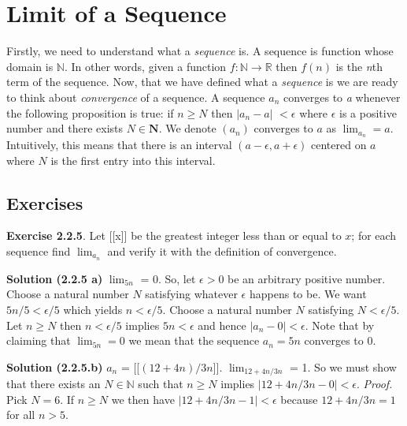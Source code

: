 \documentclass[10pt]{amsbook}
\begin{document}
\section{Limit of a Sequence}
Firstly, we need to understand what a \textit{sequence} is. A sequence is function whose domain is $\mathbb{N}$. In other words, given a function $f: \mathbb{N} \to \mathbb{R}$ then $f(n)$ is the \textit{n}th term of the sequence.
Now, that we have defined what a \textit{sequence} is  we are ready to think about \textit{convergence} of a sequence. A sequence $a_{n}$ converges to \textit{a} whenever the following proposition is true: if $n \ge N$ then $\left|a_{n}-a\right|$ $< \epsilon$ where $\epsilon$ is a positive number and there exists $N \in \mathbf{N}$. We denote $\left(a_{n}\right)$ converges to $a$ as $\lim_{a_{n}} = a$. Intuitively, this means that there is an interval $\left(a-\epsilon, a+\epsilon\right)$ centered on $a$ where $N$ is the first entry into this interval.
\subsection{Exercises}
\textbf{Exercise 2.2.5}. Let [[x]] be the greatest integer less than or equal to $x$; for each sequence find $\lim_{a_{n}}$ and verify it with the definition of convergence.

\textbf{Solution (2.2.5 a)}
$\lim_{5n}$ = 0. So, let $\epsilon > 0$ be an arbitrary positive number. Choose a natural number $N$ satisfying whatever $\epsilon$ happens to be. We want $5n/5 < \epsilon/5$ which yields $n < \epsilon / 5$. Choose a natural number $N$ satisfying  $N < \epsilon/5$. Let $n \ge N$ then  $n < \epsilon/5$ implies $5n < \epsilon$ and hence $\left|a_{n} - 0\right| < \epsilon$. Note that by claiming that $\lim_{5n} = 0$ we mean that the sequence $a_{n} = 5n$ converges to 0.

\textbf{Solution (2.2.5.b)}
$a_{n}$ = [[$(12+4n) / 3n$]].
$\lim_{12+4n/3n}$ = 1. So we must show that there exists an $N \in \mathbb{N}$ such that $n \ge N$ implies $\left|12+4n/3n-0\right| < \epsilon$. \textit{Proof.} Pick $N = 6$. If $n \ge N$ we then have $\left|12+4n/3n- 1\right| < \epsilon$ because $12+4n/3n = 1$ for all $n>5$.
\end{document}
